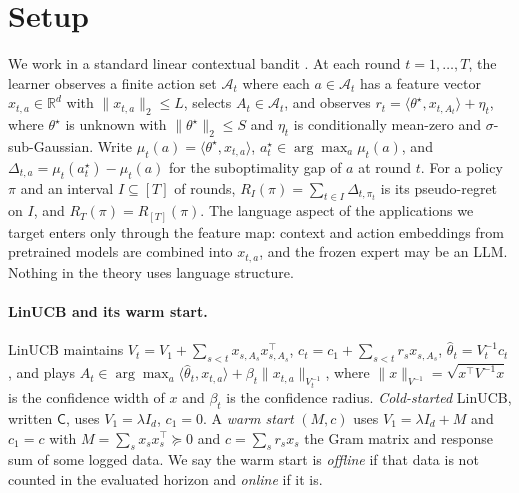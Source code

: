 \documentclass[anon]{alt2027} %
\newcommand{\Cold}{\mathsf{C}}
\begin{document}
\section{Setup}
\label{sec:setup}
\label{sec:preliminaries}

We work in a standard linear contextual bandit
\citep{abbasi2011improved,chu2011contextual,lattimore2020bandit}. At each round
$t=1,\dots,T$, the learner observes a finite action set $\mathcal A_t$ where
each $a\in\mathcal A_t$ has a feature vector $x_{t,a}\in\mathbb R^d$ with
$\|x_{t,a}\|_2\le L$, selects $A_t\in\mathcal A_t$, and observes
$r_t=\langle\theta^\star,x_{t,A_t}\rangle+\eta_t$, where $\theta^\star$ is
unknown with $\|\theta^\star\|_2\le S$ and $\eta_t$ is conditionally mean-zero
and $\sigma$-sub-Gaussian. Write $\mu_t(a)=\langle\theta^\star,x_{t,a}\rangle$,
$a_t^\star\in\arg\max_a\mu_t(a)$, and $\Delta_{t,a}=\mu_t(a_t^\star)-\mu_t(a)$
for the suboptimality gap of $a$ at round $t$. For a policy $\pi$ and an
interval $I\subseteq[T]$ of rounds, $R_I(\pi)=\sum_{t\in I}\Delta_{t,\pi_t}$ is
its pseudo-regret on $I$, and $R_T(\pi)=R_{[T]}(\pi)$. The language aspect of
the applications we target enters only through the feature map: context and
action embeddings from pretrained models are combined into $x_{t,a}$, and the
frozen expert may be an LLM. Nothing in the theory uses language structure.

\paragraph{LinUCB and its warm start.}
LinUCB maintains $V_t=V_1+\sum_{s<t}x_{s,A_s}x_{s,A_s}^\top$,
$c_t=c_1+\sum_{s<t}r_sx_{s,A_s}$, $\widehat\theta_t=V_t^{-1}c_t$, and plays
$A_t\in\arg\max_a\langle\widehat\theta_t,x_{t,a}\rangle+\beta_t\|x_{t,a}\|_{V_t^{-1}}$,
where $\|x\|_{V^{-1}}=\sqrt{x^\top V^{-1}x}$ is the confidence width of $x$ and
$\beta_t$ is the confidence radius. \emph{Cold-started} LinUCB, written
$\Cold$, uses $V_1=\lambda I_d$, $c_1=0$. A \emph{warm start} $(M,c)$ uses
$V_1=\lambda I_d+M$ and $c_1=c$ with $M=\sum_sx_sx_s^\top\succeq0$ and
$c=\sum_sr_sx_s$ the Gram matrix and response sum of some logged data. We say
the warm start is \emph{offline} if that data is not counted in the evaluated
horizon and \emph{online} if it is.
\end{document}
